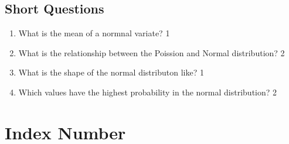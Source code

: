 \documentclass[a4paper,oneside]{book}
\begin{document}
\section{Short Questions}
  \begin{enumerate}
      \item
	What is the mean of  a normnal variate? \hfill 1
    \item
	What is the relationship between the Poission and Normal distribution? \hfill 2
    \item
	What is the shape of the normal distributon like? \hfill 1
    \item
	Which values have the highest probability in the normal distribution? \hfill 2
	 \end{enumerate}
	
\chapter{Index Number} 
\end{document}
